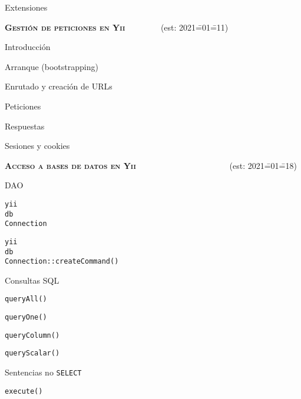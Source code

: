 \begin{longenum}
\begin{longenum}
\begin{longenum}
\begin{longenum}
                \item Extensiones
            \end{longenum}
        \end{longenum}
    \end{longenum}
    \item \textbf{\textsc{Gestión de peticiones en Yii}} \ \ \ \ \ \ \ \ (est: 2021\==01\==11)
    \begin{longenum}
        \item Introducción
        \item Arranque (bootstrapping)
        \item Enrutado y creación de URLs
        \item Peticiones
        \item Respuestas
        \item Sesiones y cookies
    \end{longenum}
    \item \textbf{\textsc{Acceso a bases de datos en Yii}} \ \ \ \ \ \ \ \ \ \ \ \ \ \ \ \ \ \ \ \ \ \ (est: 2021\==01\==18)
    \begin{longenum}
        \item DAO
        \begin{longenum}
            \item \texttt{yii\\db\\Connection}
            \item \texttt{yii\\db\\Connection::createCommand()}
            \item Consultas SQL
            \begin{longenum}
                \item \texttt{queryAll()}
                \item \texttt{queryOne()}
                \item \texttt{queryColumn()}
                \item \texttt{queryScalar()}
            \end{longenum}
            \item Sentencias no \texttt{SELECT}
            \begin{longenum}
                \item \texttt{execute()}

\end{longenum}
\end{longenum}
\end{longenum}
\end{longenum}
